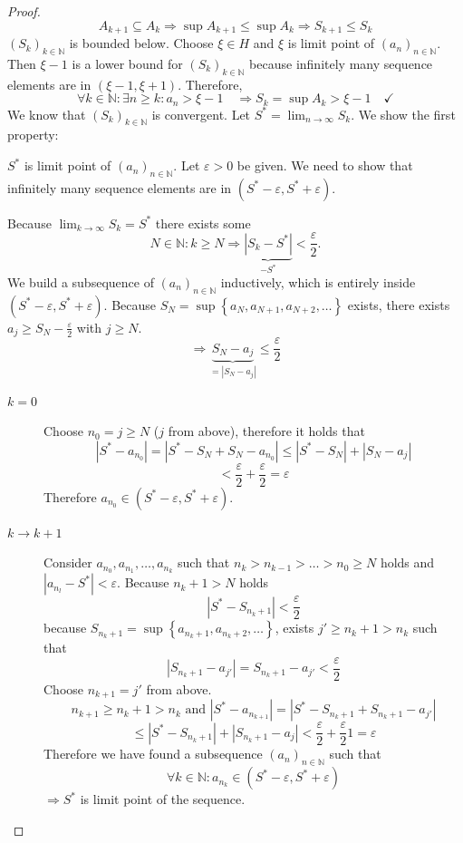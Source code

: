 \documentclass[a4paper,landscape,twocolumn]{article}
\newcommand\set[1]{\left\{#1\right\}}
\newcommand\abs[1]{\left|#1\right|}
\newcommand\seq[1]{{\left(#1\right)}_{n \in \mathbb N}}
\begin{document}
\begin{proof}
  \[ A_{k+1} \subseteq A_k \Rightarrow \sup{A_{k+1}} \leq \sup{A_{k}} \Rightarrow S_{k+1} \leq S_k \]
  $\left(S_k\right)_{k\in\mathbb N}$ is bounded below. Choose
  $\xi \in H$ and $\xi$ is limit point of $\seq{a_n}$.
  Then $\xi - 1$ is a lower bound for $\left(S_k\right)_{k\in\mathbb N}$ because infinitely many sequence elements
  are in $(\xi - 1, \xi + 1)$.
  Therefore,
  \[
    \forall k \in \mathbb N: \exists n \geq k: a_n > \xi - 1
    \quad\Rightarrow S_k = \sup{A_k} > \xi - 1
    \quad\checkmark
  \]
  We know that $\left(S_k\right)_{k\in\mathbb N}$ is convergent. Let $S^* = \lim_{n\to\infty} S_k$.
  We show the first property:

  $S^*$ is limit point of $\left(a_n\right)_{n\in\mathbb N}$.
  Let $\varepsilon > 0$ be given. We need to show that infinitely many sequence elements
  are in $(S^* - \varepsilon, S^* + \varepsilon)$.

  Because $\lim_{k\to\infty} S_k = S^*$ there exists some
  \[ N \in \mathbb N: k \geq N \Rightarrow \underbrace{\abs{S_k - S^*}}_{-S^*} < \frac\varepsilon2. \]
  We build a subsequence of $\seq{a_n}$ inductively, which is entirely inside $(S^* - \varepsilon, S^* + \varepsilon)$.
  Because $S_N = \sup\set{a_N, a_{N+1}, a_{N+2}, \dots}$ exists, there exists $a_j \geq S_N - \frac\varepsilon2$ with $j \geq N$.
  \[ \Rightarrow \underbrace{S_N - a_j}_{=\abs{S_N - a_j}} \leq \frac\varepsilon2 \]
  \begin{description}
    \item[$k = 0$]
      Choose $n_0 = j \geq N$ ($j$ from above), therefore it holds that
      \[
        \abs{S^* - a_{n_0}} = \abs{S^* - S_N + S_N - a_{n_0}} \leq \abs{S^* - S_N} + \abs{S_N - a_j}
      \] \[
        < \frac\varepsilon2 + \frac\varepsilon2
        = \varepsilon
      \]
      Therefore $a_{n_0} \in (S^* - \varepsilon, S^* + \varepsilon)$.
    \item[$k \to k+1$]
      Consider $a_{n_0}, a_{n_1}, \dots, a_{n_k}$ such that $n_k > n_{k-1} > \dots > n_0 \geq N$ holds
      and $\abs{a_{n_l} - S^*} < \varepsilon$. Because $n_k + 1 > N$ holds
      \[ \abs{S^* - S_{n_k + 1}} < \frac\varepsilon2 \]
      because $S_{n_k + 1} = \sup\set{a_{n_k + 1}, a_{n_k + 2}, \dots}$,
      exists ${j'} \geq n_k + 1 > n_k$ such that
      \[ \abs{S_{n_k + 1} - a_{j'}} = S_{n_k + 1} - a_{j'} < \frac\varepsilon2 \]
      Choose $n_{k+1} = {j'}$ from above.
      \[ n_{k+1} \geq n_k + 1 > n_k \text{ and } \abs{S^* - a_{n_{k+1}}} = \abs{S^* - S_{n_k + 1} + S_{n_k + 1} - a_{j'}} \]
      \[ \leq \abs{S^* - S_{n_k + 1}} + \abs{S_{n_k + 1} - a_{j}} < \frac\varepsilon2 + \frac\varepsilon21 = \varepsilon \]
      Therefore we have found a subsequence $\left(a_n\right)_{n\in\mathbb N}$ such that
      \[ \forall k \in \mathbb N: a_{n_k} \in (S^* - \varepsilon, S^* + \varepsilon) \]
      $\Rightarrow S^*$ is limit point of the sequence.


\end{description}
\end{proof}
\end{document}
